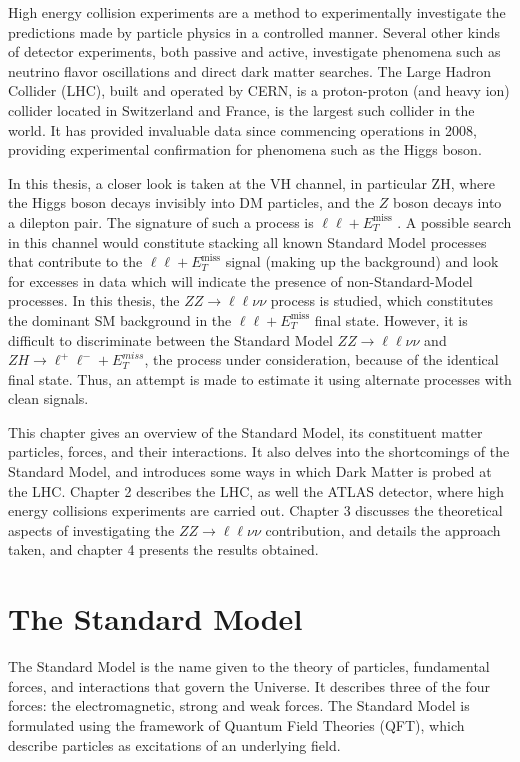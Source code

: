 \documentclass[11pt,a4paper,openright,twoside]{report}
\newcommand{\ZZ}{$ZZ\to \ell\ell\nu\nu$ }
\newcommand{\llM}{$\ell\ell+E_T^{\mathrm{miss}}$ }
\begin{document}
High energy collision experiments are a method to experimentally investigate the predictions made by particle physics in a controlled manner. Several other kinds of detector experiments, both passive and active, investigate phenomena such as neutrino flavor oscillations and direct dark matter searches. The Large Hadron Collider (LHC), built and operated by CERN, is a proton-proton (and heavy ion) collider located in Switzerland and France, is the largest such collider in the world. It has provided invaluable data since commencing operations in 2008, providing experimental confirmation for phenomena such as the Higgs boson.

In this thesis, a closer look is taken at the VH channel, in particular ZH, where the Higgs boson decays invisibly into DM particles, and the $Z$ boson decays into a dilepton pair. The signature of such a process is \llM. A possible search in this channel would constitute stacking all known Standard Model processes that contribute to the \llM signal (making up the background) and look for excesses in data which will indicate the presence of non-Standard-Model processes. In this thesis, the \ZZ process is studied, which constitutes the dominant SM background in the \llM final state. However, it is difficult to discriminate between the Standard Model \ZZ and $ZH\to \ell^+\ell^-+E_T^{miss}$, the process under consideration, because of the identical final state. Thus, an attempt is made to estimate it using alternate processes with clean signals. 

This chapter gives an overview of the Standard Model, its constituent matter particles, forces, and their interactions. It also delves into the shortcomings of the Standard Model, and introduces some ways in which Dark Matter is probed at the LHC. Chapter 2 describes the LHC, as well the ATLAS detector, where high energy collisions experiments are carried out. Chapter 3 discusses the theoretical aspects of investigating the \ZZ contribution, and details the approach taken, and chapter 4 presents the results obtained.

\section{The Standard Model}
The Standard Model is the name given to the theory of particles, fundamental forces, and interactions that govern the Universe. It describes three of the four forces: the electromagnetic, strong and weak forces. The Standard Model is formulated using the framework of Quantum Field Theories (QFT), which describe particles as excitations of an underlying field.
\end{document}
